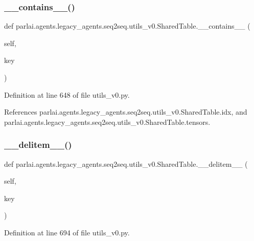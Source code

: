 \subsubsection{\texorpdfstring{\+\_\+\+\_\+contains\+\_\+\+\_\+()}{\_\_contains\_\_()}}
{\footnotesize\ttfamily def parlai.\+agents.\+legacy\+\_\+agents.\+seq2seq.\+utils\+\_\+v0.\+Shared\+Table.\+\_\+\+\_\+contains\+\_\+\+\_\+ (\begin{DoxyParamCaption}\item[{}]{self,  }\item[{}]{key }\end{DoxyParamCaption})}



Definition at line 648 of file utils\+\_\+v0.\+py.



References parlai.\+agents.\+legacy\+\_\+agents.\+seq2seq.\+utils\+\_\+v0.\+Shared\+Table.\+idx, and parlai.\+agents.\+legacy\+\_\+agents.\+seq2seq.\+utils\+\_\+v0.\+Shared\+Table.\+tensors.

\mbox{\label{classparlai_1_1agents_1_1legacy__agents_1_1seq2seq_1_1utils__v0_1_1SharedTable_a9dec1e7ee1c932cec08159e26cd6b570}} 
\subsubsection{\texorpdfstring{\+\_\+\+\_\+delitem\+\_\+\+\_\+()}{\_\_delitem\_\_()}}
{\footnotesize\ttfamily def parlai.\+agents.\+legacy\+\_\+agents.\+seq2seq.\+utils\+\_\+v0.\+Shared\+Table.\+\_\+\+\_\+delitem\+\_\+\+\_\+ (\begin{DoxyParamCaption}\item[{}]{self,  }\item[{}]{key }\end{DoxyParamCaption})}



Definition at line 694 of file utils\+\_\+v0.\+py.



